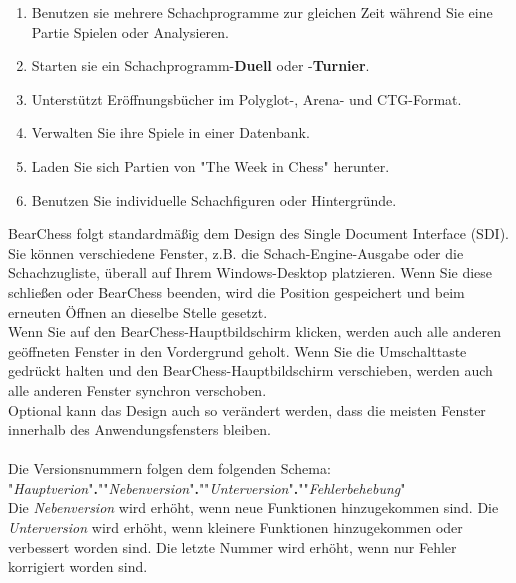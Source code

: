 \documentclass[11pt,a4paper]{article}
\begin{document}
\begin{enumerate}
		\item Benutzen sie mehrere Schachprogramme zur gleichen Zeit während Sie eine Partie Spielen oder Analysieren.
		\item Starten sie ein Schachprogramm-\textbf{Duell} oder -\textbf{Turnier}.
		\item Unterstützt Eröffnungsbücher im Polyglot-, Arena- und CTG-Format.
		\item Verwalten Sie ihre Spiele in einer Datenbank.
		\item Laden Sie sich Partien von "The Week in Chess" herunter.
		\item Benutzen Sie individuelle Schachfiguren oder Hintergründe.
	\end{enumerate}
	
	
	BearChess folgt standardmäßig dem Design des Single Document Interface (SDI). Sie können verschiedene Fenster, z.B. die Schach-Engine-Ausgabe oder die Schachzugliste, überall auf Ihrem Windows-Desktop platzieren. Wenn Sie diese schließen oder BearChess beenden, wird die Position gespeichert und beim erneuten Öffnen an dieselbe Stelle gesetzt.\\ 
	Wenn Sie auf den BearChess-Hauptbildschirm klicken, werden auch alle anderen geöffneten Fenster in den Vordergrund geholt. Wenn Sie die Umschalttaste gedrückt halten und den BearChess-Hauptbildschirm verschieben, werden auch alle anderen Fenster synchron verschoben.\\
	Optional kann das Design auch so verändert werden, dass die meisten Fenster innerhalb des Anwendungsfensters bleiben.\\\\
	Die Versionsnummern folgen dem folgenden Schema:\\ 
	"\textit{Hauptverion}"\textbf{.}""\textit{Nebenversion}"\textbf{.}""\textit{Unterversion}"\textbf{.}""\textit{Fehlerbehebung}"\\
	Die \textit{Nebenversion} wird erhöht, wenn neue Funktionen hinzugekommen sind. Die \textit{Unterversion} wird erhöht, wenn kleinere Funktionen hinzugekommen oder verbessert worden sind. Die letzte Nummer wird erhöht, wenn nur Fehler korrigiert worden sind.
	
	
\end{document}
